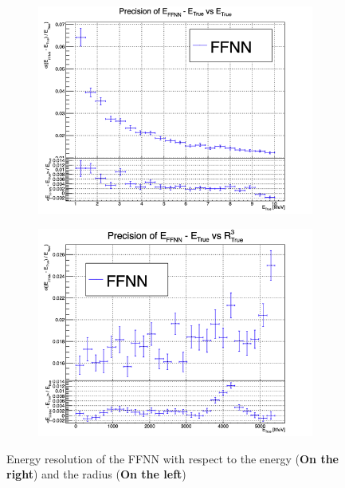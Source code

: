 \documentclass[../main.tex]{subfiles}
\begin{document}
\begin{figure}[ht]
  \centering
  \begin{subfigure}[t]{0.48\linewidth}
    \includegraphics[width=\linewidth]{images/janne/ffnn/ESBE.png}
  \end{subfigure}
  \hfill
  \begin{subfigure}[t]{0.48\linewidth}
    \includegraphics[width=\linewidth]{images/janne/ffnn/ESBR.png}
  \end{subfigure}
  \caption{Energy resolution of the FFNN with respect to the energy (\textbf{On the right}) and the radius (\textbf{On the left})}
  \label{fig:janne:ffnn:ESB}
\end{figure}
\end{document}
